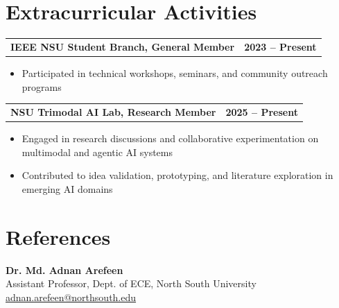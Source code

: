 \documentclass[11pt,letterpaper]{article}
\makeatletter
\newcommand{\entryhead}[2]{\par\vspace{3pt}\noindent%
  \begin{tabular*}{\textwidth}[t]{@{}>{\raggedright\arraybackslash}p{0.73\textwidth}@{\extracolsep{\fill}}r@{}}
    \textbf{#1} & #2
  \end{tabular*}\par\vspace{-1pt}}
\newcommand{\entry}[2]{\entryhead{#1}{\textbf{#2}}}
\newcommand{\gap}{\par\vspace{3pt}}
\makeatother
\begin{document}
\section{Extracurricular Activities}
\entry{IEEE NSU Student Branch, General Member}{2023 -- Present}
\begin{itemize}
  \item Participated in technical workshops, seminars, and community outreach programs
\end{itemize}
\gap
\entry{NSU Trimodal AI Lab, Research Member}{2025 -- Present}
\begin{itemize}
  \item Engaged in research discussions and collaborative experimentation on multimodal and
    agentic AI systems
  \item Contributed to idea validation, prototyping, and literature exploration in emerging AI domains
\end{itemize}

\section{References}
\textbf{Dr. Md. Adnan Arefeen}\\
Assistant Professor, Dept. of ECE, North South University\\
\href{mailto:adnan.arefeen@northsouth.edu}{adnan.arefeen@northsouth.edu}
\end{document}
